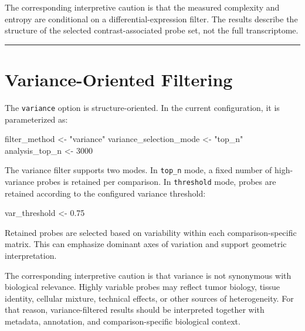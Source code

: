 \documentclass[
  letterpaper,
  DIV=11,
  numbers=noendperiod,
  openany,
  oneside]{scrreprt}
\newenvironment{Shaded}{\begin{snugshade}}{\end{snugshade}}
\newcommand{\DecValTok}[1]{\textcolor[rgb]{0.68,0.00,0.00}{#1}}
\newcommand{\FloatTok}[1]{\textcolor[rgb]{0.68,0.00,0.00}{#1}}
\newcommand{\NormalTok}[1]{\textcolor[rgb]{0.00,0.23,0.31}{#1}}
\newcommand{\OtherTok}[1]{\textcolor[rgb]{0.00,0.23,0.31}{#1}}
\newcommand{\StringTok}[1]{\textcolor[rgb]{0.13,0.47,0.30}{#1}}
\begin{document}
The corresponding interpretive caution is that the measured complexity
and entropy are conditional on a differential-expression filter. The
results describe the structure of the selected contrast-associated probe
set, not the full transcriptome.

\begin{center}\rule{0.5\linewidth}{0.5pt}\end{center}

\section{Variance-Oriented Filtering}\label{variance-oriented-filtering}

The \texttt{variance} option is structure-oriented. In the current
configuration, it is parameterized as:

\begin{Shaded}
\begin{Highlighting}[]
\NormalTok{filter\_method }\OtherTok{\textless{}{-}} \StringTok{"variance"}
\NormalTok{variance\_selection\_mode }\OtherTok{\textless{}{-}} \StringTok{"top\_n"}
\NormalTok{analysis\_top\_n }\OtherTok{\textless{}{-}} \DecValTok{3000}
\end{Highlighting}
\end{Shaded}

The variance filter supports two modes. In \texttt{top\_n} mode, a fixed
number of high-variance probes is retained per comparison. In
\texttt{threshold} mode, probes are retained according to the configured
variance threshold:

\begin{Shaded}
\begin{Highlighting}[]
\NormalTok{var\_threshold }\OtherTok{\textless{}{-}} \FloatTok{0.75}
\end{Highlighting}
\end{Shaded}

Retained probes are selected based on variability within each
comparison-specific matrix. This can emphasize dominant axes of
variation and support geometric interpretation.

The corresponding interpretive caution is that variance is not
synonymous with biological relevance. Highly variable probes may reflect
tumor biology, tissue identity, cellular mixture, technical effects, or
other sources of heterogeneity. For that reason, variance-filtered
results should be interpreted together with metadata, annotation, and
comparison-specific biological context.
\end{document}
